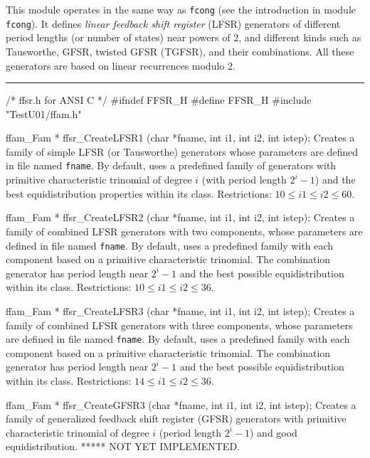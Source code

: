 
This module operates in the same way as {\tt fcong}
(see the introduction in module  {\tt fcong}).
It defines {\em linear feedback shift register\/} (LFSR) generators
of different period lengths (or number of states) near powers of 2,
and different kinds such as Tausworthe, GFSR, twisted GFSR (TGFSR),
and their combinations.
All these generators are based on linear recurrences modulo 2.
%


\bigskip
\hrule
\code\hide
/* ffsr.h  for ANSI C */
#ifndef FFSR_H
#define FFSR_H
\endhide
#include "TestU01/ffam.h"
\endcode



\code

ffam_Fam * ffsr_CreateLFSR1 (char *fname, int i1, int i2, int istep);
\endcode
\tab
 Creates a family of simple LFSR (or Tausworthe) generators whose
 parameters are defined in file named {\tt fname}. By default, uses a 
 predefined family of generators with primitive characteristic trinomial of
 degree $i$ (with period length $2^i-1$) and the best equidistribution 
 properties within its class.
 Restrictions: $10 \le i1 \le i2 \le 60$.
\endtab
\code


ffam_Fam * ffsr_CreateLFSR2 (char *fname, int i1, int i2, int istep);
\endcode
\tab Creates a family of combined LFSR generators with two components, whose
 parameters are defined in file named {\tt fname}. By default, uses a 
 predefined family  with each component
 based on a primitive characteristic trinomial.
 The combination generator has period length near $2^i-1$ and the best
 possible equidistribution within its class. 
 Restrictions: $10 \le i1 \le i2 \le 36$.
\endtab
\code


ffam_Fam * ffsr_CreateLFSR3 (char *fname, int i1, int i2, int istep);
\endcode
\tab
 Creates a family of combined LFSR generators with three components, whose
 parameters are defined in file named {\tt fname}. By default, uses a 
 predefined family with each component
 based on a primitive characteristic trinomial.
 The combination generator has period length near $2^i-1$ and the best
 possible equidistribution within its class. 
 Restrictions: $14 \le i1 \le i2 \le 36$.
\endtab
\code


ffam_Fam * ffsr_CreateGFSR3 (char *fname, int i1, int i2, int istep);
\endcode
\tab
 Creates a family of generalized feedback shift register (GFSR) generators
 with primitive characteristic trinomial of degree $i$
 (period length $2^i-1$) and good equidistribution.
 ***** NOT YET IMPLEMENTED.
\endtab
\code


